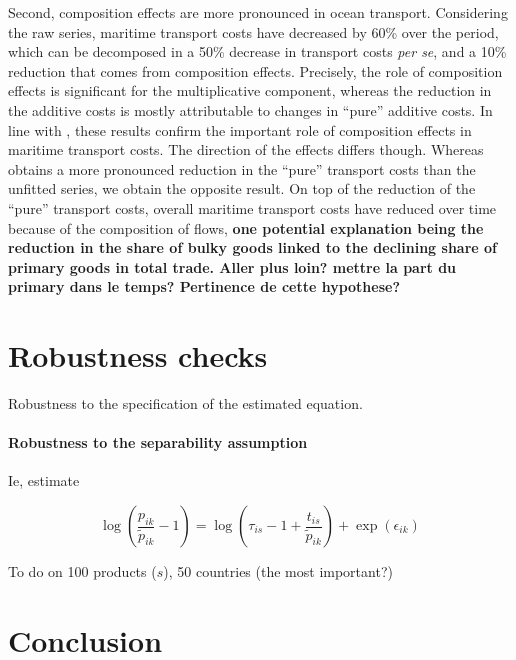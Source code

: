 \documentclass[a4paper,11pt]{article}
\begin{document}
Second, composition effects are more pronounced in ocean transport. Considering the raw series, maritime transport costs have decreased by 60\% over the period, which can be decomposed in a 50\% decrease in transport costs \textit{per se}, and a 10\% reduction that comes from composition effects. Precisely, the role of composition effects is significant for the multiplicative component, whereas the reduction in the additive costs is mostly attributable to changes in ``pure'' additive costs. In line with \citet{hummels2007}, these results confirm the important role of composition effects in maritime transport costs. The direction of the effects differs though. Whereas  \citet{hummels2007} obtains a more pronounced reduction in the ``pure'' transport costs than the unfitted series, we obtain the opposite result. On top of the reduction of the ``pure'' transport costs, overall maritime transport costs have reduced over time because of the composition of flows, \textbf{one potential explanation being the reduction in the share of bulky goods linked to the declining share of primary goods in total trade. Aller plus loin? mettre la part du primary dans le temps? Pertinence de cette hypothese?}





\section{Robustness checks}

Robustness to the specification of the estimated equation.

\paragraph{Robustness to the separability assumption}


Ie, estimate


$$\log(\frac{p_{ik}}{\widetilde{p}_{ik}} -1)= \log(\tau_{is} -1+ \frac{t_{is}}{\widetilde{p}_{ik}})+ \exp(\epsilon_{ik})$$

To do on 100 products ($s$), 50 countries (the most important?)


\section{Conclusion \label{sec:conclu}}
\end{document}
